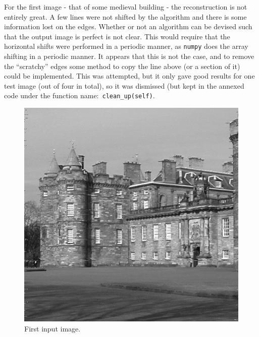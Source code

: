 \documentclass[a4paper,12pt]{article}
\begin{document}
For the first image - that of some medieval building - the reconstruction is not entirely great. A few lines were not shifted by the algorithm and there is some information lost on the edges. Whether or not an algorithm can be devised such that the output image is perfect is not clear. This would require that the horizontal shifts were performed in a periodic manner, as \texttt{numpy} does the array shifting in a periodic manner. It appears that this is not the case, and to remove the ``scratchy'' edges some method to copy the line above (or a section of it) could be implemented. This was attempted, but it only gave good results for one test image (out of four in total), so it was dismissed (but kept in the annexed code under the function name:~\texttt{clean\_up(self)}.

\begin{figure}[h]
\centering
\begin{minipage}{.5\textwidth}
  \centering
  \includegraphics[width=0.95\linewidth]{img/desync1}
  \caption{First input image.}
  \label{fig.6}
\end{minipage}%
\begin{minipage}{.5\textwidth}
  \centering

\end{minipage}
\end{figure}
\end{document}
